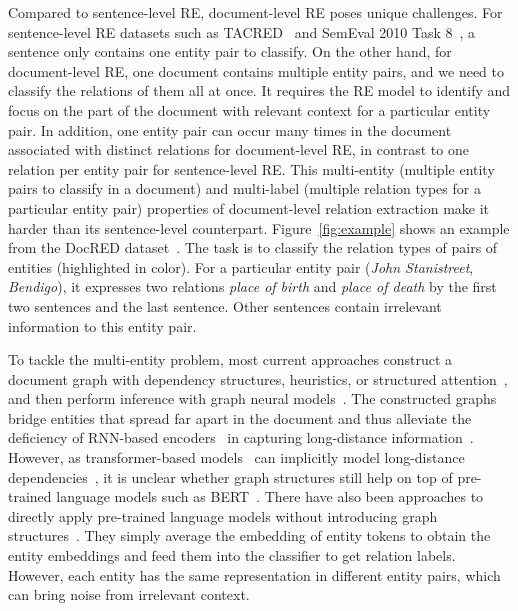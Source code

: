 \documentclass[letterpaper]{article}
\begin{document}
Compared to sentence-level RE, document-level RE poses unique challenges.
For sentence-level RE datasets such as TACRED~\cite{Zhang2017PositionawareAA} and SemEval 2010 Task 8~\cite{Hendrickx2009SemEval2010T8}, a sentence only contains one entity pair to classify.
On the other hand, for document-level RE, one document contains multiple entity pairs, and we need to classify the relations of them all at once.
It requires the RE model to identify and focus on the part of the document with relevant context for a particular entity pair.
In addition, one entity pair can occur many times in the document associated with distinct relations for document-level RE, in contrast to one relation per entity pair for sentence-level RE.
This multi-entity (multiple entity pairs to classify in a document) and multi-label (multiple relation types for a particular entity pair) properties of document-level relation extraction make it harder than its sentence-level counterpart.
Figure~\ref{fig:example} shows an example from the DocRED dataset~\cite{Yao2019DocREDAL}.
The task is to classify the relation types of pairs of entities (highlighted in color).
For a particular entity pair  (\textit{John Stanistreet}, \textit{Bendigo}), it expresses two relations \textit{place of birth} and \textit{place of death} by the first two sentences and the last sentence.
Other sentences contain irrelevant information to this entity pair.

To tackle the multi-entity problem, most current approaches construct a document graph with dependency structures, heuristics, or structured attention~\cite{Peng2017CrossSentenceNR,Liu2018LearningST,Christopoulou2019ConnectingTD,Nan2020ReasoningWL}, and then perform inference with graph neural models~\cite{Liang2016SemanticOP,Guo2019AttentionGG}.
The constructed graphs bridge entities that spread far apart in the document and thus alleviate the deficiency of RNN-based encoders~\cite{Hochreiter1997LongSM,Chung2014EmpiricalEO} in capturing long-distance information~\cite{Khandelwal2018SharpNF}.
However, as transformer-based models~\cite{Vaswani2017AttentionIA} can implicitly model long-distance dependencies~\cite{Clark2019WhatDB,Tenney2019BERTRT}, it is unclear whether graph structures still help on top of pre-trained language models such as BERT~\cite{Devlin2019BERTPO}.
There have also been approaches to directly apply pre-trained language models without introducing graph structures~\cite{Wang2019FinetuneBF,Tang2020HINHI}.
They simply average the embedding of entity tokens to obtain the entity embeddings and feed them into the classifier to get relation labels.
However, each entity has the same representation in different entity pairs, which can bring noise from irrelevant context.
\end{document}
